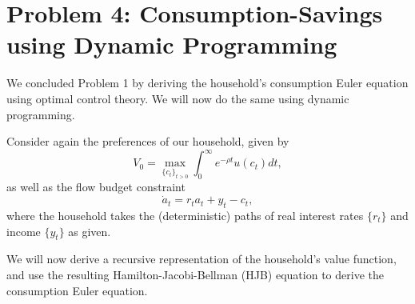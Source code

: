 \documentclass[11pt]{extarticle}
\theoremstyle{plain}
\theoremstyle{definition}
\begin{document}
\vspace{5mm}
\section*{Problem 4: Consumption-Savings using Dynamic Programming}

We concluded Problem 1 by deriving the household's consumption Euler equation using optimal control theory. We will now do the same using dynamic programming.


Consider again the preferences of our household, given by
\begin{equation*}
	V_0 = \max_{\{c_t\}_{t>0}} \int_0^\infty e^{-\rho t} u(c_t) dt,
\end{equation*}
as well as the flow budget constraint
\begin{equation*}
	\dot a_t = r_t a_t + y_t - c_t,
\end{equation*}
where the household takes the (deterministic) paths of real interest rates $\{r_t\}$ and income $\{y_t\}$ as given.


We will now derive a recursive representation of the household's value function, and use the resulting Hamilton-Jacobi-Bellman (HJB) equation to derive the consumption Euler equation.
\end{document}
